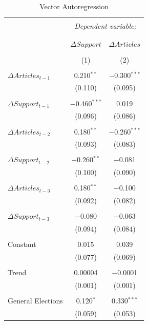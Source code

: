\documentclass[12pt,article]{article}
\begin{document}
\begin{table}[!htbp] \centering 
  \caption{Vector Autoregression} 
  \label{} 
\begin{tabular}{@{\extracolsep{5pt}}lcc} 
\\[-1.8ex]\hline 
\hline \\[-1.8ex] 
 & \multicolumn{2}{c}{\textit{Dependent variable:}} \\ 
\cline{2-3} 
\\[-1.8ex] & \multicolumn{2}{c}{} \\ 
 & $\Delta Support$ & $\Delta Articles$ \\ 
\\[-1.8ex] & (1) & (2)\\ 
\hline \\[-1.8ex] 
 $\Delta Articles_{t-1}$ & 0.210$^{**}$ & $-$0.300$^{***}$ \\ 
  & (0.110) & (0.095) \\ 
  & & \\ 
 $\Delta Support_{t-1}$ & $-$0.460$^{***}$ & 0.019 \\ 
  & (0.096) & (0.086) \\ 
  & & \\ 
 $\Delta Articles_{t-2}$ & 0.180$^{**}$ & $-$0.260$^{***}$ \\ 
  & (0.093) & (0.083) \\ 
  & & \\ 
 $\Delta Support_{t-2}$ & $-$0.260$^{**}$ & $-$0.081 \\ 
  & (0.100) & (0.090) \\ 
  & & \\ 
 $\Delta Articles_{t-3}$ & 0.180$^{**}$ & $-$0.100 \\ 
  & (0.092) & (0.082) \\ 
  & & \\ 
 $\Delta Support_{t-3}$ & $-$0.080 & $-$0.063 \\ 
  & (0.094) & (0.084) \\ 
  & & \\ 
 Constant & 0.015 & 0.039 \\ 
  & (0.077) & (0.069) \\ 
  & & \\ 
 Trend & 0.00004 & $-$0.0001 \\ 
  & (0.001) & (0.001) \\ 
  & & \\ 
 General Elections & 0.120$^{*}$ & 0.330$^{***}$ \\ 
  & (0.059) & (0.053) \\ 

\end{tabular}
\end{table}
\end{document}
